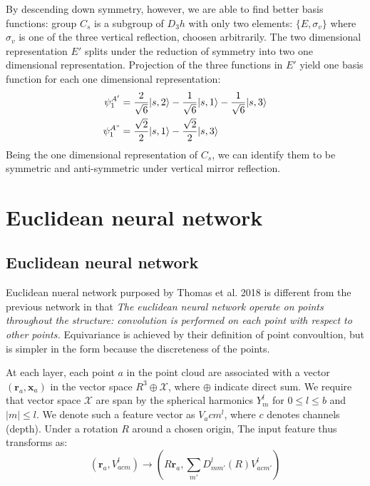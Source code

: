 \documentclass{article}
\begin{document}
By descending down symmetry, however, we are able to find better basis functions: group $C_s$ is a subgroup 
of $D_3h$ with only two elements: $\{E, \sigma_v\}$ where $\sigma_v$ is one of the three vertical reflection, 
choosen arbitrarily. 
The two dimensional representation $E'$ splits under the reduction of symmetry into two one dimensional representation.
Projection of the three functions in $E'$ yield one basis function for each one dimensional representation:
\begin{align}
    \psi_1^{A'} &= \frac{2}{\sqrt{6}} |s,2\rangle - \frac{1}{\sqrt{6}} |s,1\rangle - \frac{1}{\sqrt{6}} |s,3\rangle \\
    \psi_1^{A"} &= \frac{\sqrt{2}}{2} |s,1\rangle - \frac{\sqrt{2}}{2} |s,3\rangle
\end{align}
Being the one dimensional representation of $C_s$, we can identify them to be 
symmetric and anti-symmetric under vertical mirror reflection. 

\section{Euclidean neural network}
\subsection{Euclidean neural network}

Euclidean nueral network purposed by Thomas et al. 2018\cite{thomas_tensor_2018} is different from the previous network in that
\emph{The euclidean neural network operate on points throughout the structure: convolution is performed on each point with respect to other points.}
Equivariance is achieved by their definition of point convoultion, but is simpler in the form because the discreteness of the 
points.

At each layer, each point $a$ in the point cloud are associated with a vector $(\mathbf{r}_a, \mathbf{x}_a)$ 
in the vector space $R^3 \oplus \mathcal{X}$, where $\oplus$ indicate direct sum. We require that vector space $\mathcal{X}$ are span 
by the spherical harmonics $Y_m^l$ for $0\leq l \leq b$ and $|m|\leq l$. We denote such a feature 
vector as $V_acm^l$, where $c$ denotes channels (depth). 
Under a rotation $R$ around a chosen origin, The input feature thus transforms as:
\begin{equation}
    (\mathbf{r}_{a}, V_{acm}^l) \to (R \mathbf{r}_{a}, \sum_{m'}D_{mm'}^l(R)V_{acm'}^l) \label{E:3dnn_rotation_input}
\end{equation}
\end{document}
